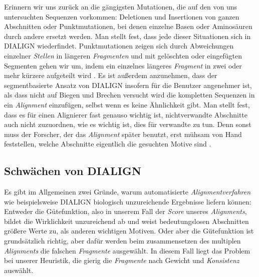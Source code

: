 Erinnern wir uns zurück an die gängigsten Mutationen, die auf den von uns untersuchten Sequenzen vorkommen: Deletionen und Insertionen von ganzen Abschnitten oder Punktmutationen, bei denen einzelne Basen oder Aminosäuren durch andere ersetzt werden. Man stellt fest, dass jede dieser Situationen sich in DIALIGN wiederfindet. Punktmutationen zeigen sich durch Abweichungen einzelner \emph{Stellen} in längeren \emph{Fragmenten} und mit gelöschten oder eingefügten Segmenten gehen wir um, indem ein einzelnes längeres \emph{Fragment} in zwei oder mehr kürzere aufgeteilt wird \citep{mfdw98}. Es ist außerdem anzunehmen, dass der segmentbasierte Ansatz von DIALIGN insofern für die Benutzer angenehmer ist, als dass nicht auf Biegen und Brechen versucht wird die kompletten Sequenzen in ein \emph{Alignment} einzufügen, selbst wenn es keine Ähnlichkeit gibt. Man stellt fest, dass es für einen Alignierer fast genauso wichtig ist, nichtverwandte Abschnitte auch nicht zuzuordnen, wie es wichtig ist, dies für verwandte zu tun. Denn sonst muss der Forscher, der das \emph{Alignment} später benutzt, erst mühsam von Hand feststellen, welche Abschnitte eigentlich die gesuchten Motive sind \citep{m99}.

\subsection{Schwächen von DIALIGN}

Es gibt im Allgemeinen zwei Gründe, warum automatisierte \emph{Alignmentverfahren} wie beispielsweise DIALIGN biologisch unzureichende Ergebnisse liefern können: Entweder die Gütefunktion, also in unserem Fall der \emph{Score} unseres \emph{Alignments}, bildet die Wirklichkeit unzureichend ab und weist bedeutungslosen Abschnitten größere Werte zu, als anderen wichtigen Motiven. Oder aber die Gütefunktion ist grundsätzlich richtig, aber dafür werden beim zusammensetzen des multiplen \emph{Alignments} die falschen \emph{Fragmente} ausgewählt. In diesem Fall liegt das Problem bei unserer Heuristik, die gierig die \emph{Fragmente} nach Gewicht und \emph{Konsistenz} auswählt. 

